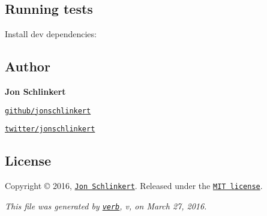 \subsection*{Running tests}

Install dev dependencies\+:




\subsection*{Author}

{\bfseries Jon Schlinkert}


\begin{DoxyItemize}
\item \href{https://github.com/jonschlinkert}{\tt github/jonschlinkert}
\item \href{http://twitter.com/jonschlinkert}{\tt twitter/jonschlinkert}
\end{DoxyItemize}

\subsection*{License}

Copyright © 2016, \href{https://github.com/jonschlinkert}{\tt Jon Schlinkert}. Released under the \href{https://github.com/jonschlinkert/has-values/blob/master/LICENSE}{\tt M\+IT license}.





{\itshape This file was generated by \href{https://github.com/verbose/verb}{\tt verb}, v, on March 27, 2016.} 